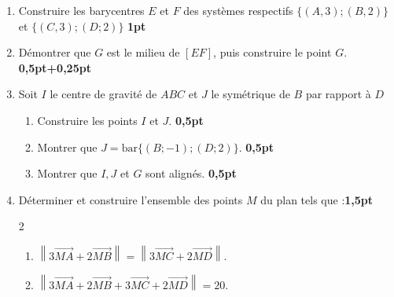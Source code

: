 \documentclass[12pt,a4paper]{article}
\begin{document}
\begin{enumerate}
    \item Construire les barycentres $E$ et $F$ des systèmes respectifs $\{(A,3);(B,2)\}$ et $\{(C,3);(D;2)\}$ \hfill \textbf{1pt}
    
    \item Démontrer que $G$ est le milieu de $[EF]$, puis construire le point $G$. \hfill \textbf{0,5pt+0,25pt}
    
    \item Soit $I$ le centre de gravité de $ABC$ et $J$ le symétrique de $B$ par rapport à $D$
    \begin{enumerate}
        \item Construire les points $I$ et $J$. \hfill \textbf{0,5pt}
        \item Montrer que $J = \text{bar}\{(B;-1);(D;2)\}$. \hfill \textbf{0,5pt}
        \item Montrer que $I, J$ et $G$ sont alignés. \hfill \textbf{0,5pt}
    \end{enumerate}
    
    \item Déterminer et construire l'ensemble des points $M$ du plan tels que :\hfill \textbf{1,5pt}
    \begin{multicols}{2}
\setlength{\columnseprule}{0.9mm} %
    \begin{enumerate}
        \item $\left\|3\overrightarrow{MA} + 2\overrightarrow{MB}\right\| = \left\|3\overrightarrow{MC} + 2\overrightarrow{MD}\right\|$.
        \item $\left\|3\overrightarrow{MA} + 2\overrightarrow{MB} + 3\overrightarrow{MC} + 2\overrightarrow{MD}\right\| = 20$.
    \end{enumerate}
    \end{multicols}
\end{enumerate}
\end{document}
